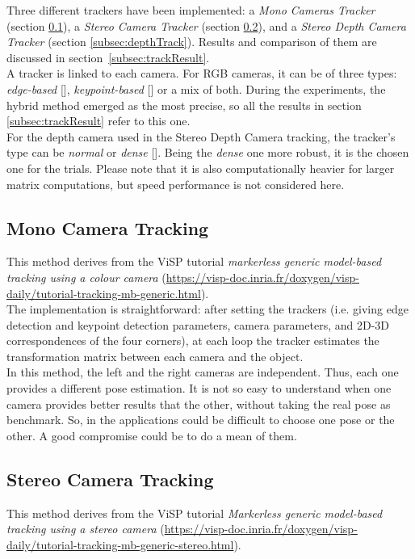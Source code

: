 Three different trackers have been implemented: a \textit{Mono Cameras Tracker} (section \ref{subsec:monoTrack}), a \textit{Stereo Camera Tracker} (section \ref{subsec:stereoTrack}), and a \textit{Stereo Depth Camera Tracker} (section \ref{subsec:depthTrack}). Results and comparison of them are discussed in \mbox{section \ref{subsec:trackResult}}.\\

A tracker is linked to each camera. For RGB cameras, it can be of three types: \textit{edge-based} [\cite{visp-edge}], \textit{keypoint-based} [\cite{visp-klt}] or a mix of both. During the experiments, the hybrid method emerged as the most precise, so all the results in section \ref{subsec:trackResult} refer to this one.\\
For the depth camera used in the Stereo Depth Camera tracking, the tracker's type can be \textit{normal} or \textit{dense} [\cite{visp-depth}]. Being the \textit{dense} one more robust, it is the chosen one for the trials. Please note that it is also computationally heavier for larger matrix computations, but speed performance is not considered here.

\subsection{Mono Camera Tracking}
\label{subsec:monoTrack}
This method derives from the ViSP tutorial \textit{markerless generic model-based tracking using a colour camera}  (\url{https://visp-doc.inria.fr/doxygen/visp-daily/tutorial-tracking-mb-generic.html}).\\

The implementation is straightforward: after setting the trackers (i.e. giving edge detection and keypoint detection parameters, camera parameters, and 2D-3D correspondences of the four corners), at each loop the tracker estimates the transformation matrix between each camera and the object.\\

In this method, the left and the right cameras are independent. Thus, each one provides a different pose estimation. It is not so easy to understand when one camera provides better results that the other, without taking the real pose as benchmark. So, in the applications could be difficult to choose one pose or the other. A good compromise could be to do a mean of them.\\

\subsection{Stereo Camera Tracking}
\label{subsec:stereoTrack}
This method derives from the ViSP tutorial \textit{Markerless generic model-based tracking using a stereo camera} (\url{https://visp-doc.inria.fr/doxygen/visp-daily/tutorial-tracking-mb-generic-stereo.html}).\\


